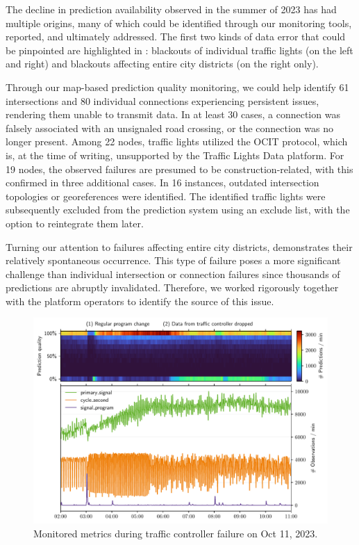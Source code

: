 The decline in prediction availability observed in the summer of 2023 has had multiple origins, many of which could be identified through our monitoring tools, reported, and ultimately addressed. The first two kinds of data error that could be pinpointed are highlighted in  : blackouts of individual traffic lights (on the left and right) and blackouts affecting entire city districts (on the right only).

Through our map-based prediction quality monitoring, we could help identify 61 intersections and 80 individual connections experiencing persistent issues, rendering them unable to transmit data. In at least 30 cases, a connection was falsely associated with an unsignaled road crossing, or the connection was no longer present. Among 22 nodes, traffic lights utilized the OCIT protocol, which is, at the time of writing, unsupported by the Traffic Lights Data platform. For 19 nodes, the observed failures are presumed to be construction-related, with this confirmed in three additional cases. In 16 instances, outdated intersection topologies or georeferences were identified. The identified traffic lights were subsequently excluded from the prediction system using an exclude list, with the option to reintegrate them later.

Turning our attention to failures affecting entire city districts,  demonstrates their relatively spontaneous occurrence. This type of failure poses a more significant challenge than individual intersection or connection failures since thousands of predictions are abruptly invalidated. Therefore, we worked rigorously together with the platform operators to identify the source of this issue.

\begin{figure}[t]
    \centering
    \includegraphics[width=\linewidth]{images/monitoring-failure.pdf}
    \caption{Monitored metrics during traffic controller failure on Oct 11, 2023.}\label{fig:monitoring-failure}
\end{figure}

